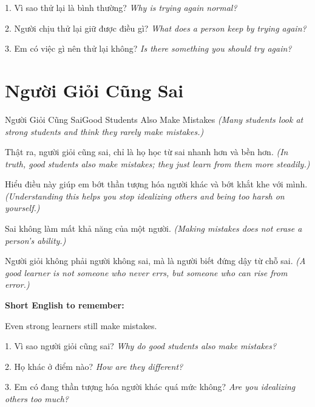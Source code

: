 \begin{tuhocnhanh}
1. Vì sao thử lại là bình thường? \textit{Why is trying again normal?}

2. Người chịu thử lại giữ được điều gì? \textit{What does a person keep by trying again?}

3. Em có việc gì nên thử lại không? \textit{Is there something you should try again?}
\end{tuhocnhanh}
\ngancach

\section{Người Giỏi Cũng Sai}
\begin{truyen}{Người Giỏi Cũng Sai}{Good Students Also Make Mistakes}
\textit{(Many students look at strong students and think they rarely make mistakes.)}

Thật ra, người giỏi cũng sai, chỉ là họ học từ sai nhanh hơn và bền hơn.
\textit{(In truth, good students also make mistakes; they just learn from them more steadily.)}

Hiểu điều này giúp em bớt thần tượng hóa người khác và bớt khắt khe với mình.
\textit{(Understanding this helps you stop idealizing others and being too harsh on yourself.)}

Sai không làm mất khả năng của một người.
\textit{(Making mistakes does not erase a person's ability.)}
\end{truyen}

\begin{baihoc}
Người giỏi không phải người không sai, mà là người biết đứng dậy từ chỗ sai.
\textit{(A good learner is not someone who never errs, but someone who can rise from error.)}
\end{baihoc}

\begin{ghinhoanh}
\textbf{Short English to remember:}

Even strong learners still make mistakes.

\end{ghinhoanh}

\begin{tuhocnhanh}
1. Vì sao người giỏi cũng sai? \textit{Why do good students also make mistakes?}

2. Họ khác ở điểm nào? \textit{How are they different?}

3. Em có đang thần tượng hóa người khác quá mức không? \textit{Are you idealizing others too much?}
\end{tuhocnhanh}
\ngancach


